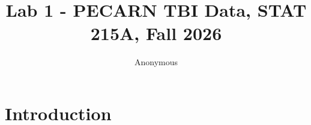 \documentclass[10pt,letterpaper]{article}
\title{Lab 1 - PECARN TBI Data, STAT 215A, Fall 2026}
\author{Anonymous}
\begin{document}
\maketitle


\section{Introduction}\label{introduction}

\end{document}
